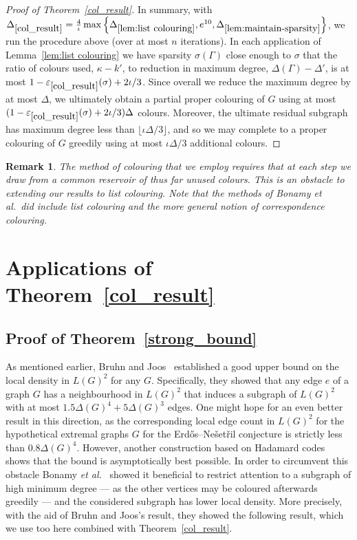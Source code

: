 \documentclass[11pt]{article}
\theoremstyle{plain}
\newtheorem*{rem}{Remark}
\newcommand{\eps}{\varepsilon}
\begin{document}
\begin{proof}[Proof of Theorem~\ref{col_result}]
In summary, with $\Delta_{\ref{col_result}}=\frac{4}{\iota}\max\left\{\Delta_{\ref{lem:list colouring}},e^{10},\Delta_{\ref{lem:maintain-sparsity}}\right\}$, we run the procedure above (over at most $n$ iterations).
In each application of Lemma~\ref{lem:list colouring} we have sparsity $\sigma(\Gamma)$ close enough to $\sigma$ that the ratio of colours used, $\kappa-k'$, to reduction in maximum degree, $\Delta(\Gamma)-\Delta'$, is at most
$1-\eps_{\ref{col_result}}(\sigma)+2\iota/3$. Since overall we reduce the maximum degree by at most $\Delta$, we ultimately obtain a partial proper colouring of $G$ using at most 
$(1-\eps_{\ref{col_result}}(\sigma)+2\iota/3)\Delta$ colours. 
Moreover, the ultimate residual subgraph has maximum degree less than $\lfloor\iota\Delta/3\rfloor$, and so we may complete to a proper colouring of $G$ greedily using at most $\iota\Delta/3$ additional colours. 
\end{proof}


\begin{rem}
The method of colouring that we employ requires that at each step we draw from a common reservoir of thus far unused colours. This is an obstacle to extending our results to list colouring. Note that the methods of Bonamy {\em et al.}~did include list colouring and the more general notion of correspondence colouring.
\end{rem}


\section{Applications of Theorem~\ref{col_result}}\label{sec:applications}

\subsection{Proof of Theorem~\ref{strong_bound}}\label{sub:ErdosNesetrilproof}

As mentioned earlier, Bruhn and Joos~\cite{BrJo18} established a good upper bound on the local density in $L(G)^2$ for any $G$. Specifically, they showed that any edge $e$ of a graph $G$ has a neighbourhood in $L(G)^2$ that induces a subgraph of $L(G)^2$ with at most $1.5\Delta(G)^4+5\Delta(G)^3$ edges. 
One might hope for an even better result in this direction, as the corresponding local edge count in $L(G)^2$ for the hypothetical extremal graphs $G$ for the Erd\H{o}s--Ne\v{s}et\v{r}il conjecture is strictly less than $0.8\Delta(G)^4$.
However, another construction based on Hadamard codes shows that the bound is asymptotically best possible. In order to circumvent this obstacle Bonamy {\em et al.}~\cite{BPP18+} showed it beneficial to restrict attention to a subgraph of high minimum degree --- as the other vertices may be coloured afterwards greedily --- and the considered subgraph has lower local density. More precisely, with the aid of Bruhn and Joos's result, they showed the following result, which we use too here combined with Theorem~\ref{col_result}.
\end{document}
